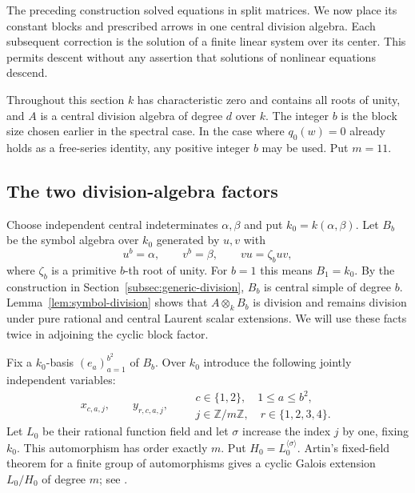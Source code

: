 \documentclass[11pt]{article}
\theoremstyle{definition}
\theoremstyle{remark}
\numberwithin{equation}{section}
\begin{document}
The preceding construction solved equations in split matrices.  We now
place its constant blocks and prescribed arrows in one central division
algebra.  Each subsequent correction is the solution of a finite linear
system over its center.  This permits descent without any assertion that
solutions of nonlinear equations descend.

Throughout this section $k$ has characteristic zero and contains all roots
of unity, and $A$ is a central division algebra of degree $d$ over $k$.
The integer $b$ is the block size chosen earlier in the spectral case.
In the case where $q_0(w)=0$ already holds as a free-series identity, any
positive integer $b$ may be used.  Put $m=11$.

\subsection{The two division-algebra factors}

Choose independent central indeterminates $\alpha,\beta$ and put
$k_0=k(\alpha,\beta)$.  Let $B_b$ be the symbol algebra over $k_0$
generated by $u,v$ with
\[
 u^b=\alpha,\qquad v^b=\beta,\qquad vu=\zeta_buv,
\]
where $\zeta_b$ is a primitive $b$-th root of unity.  For $b=1$ this
means $B_1=k_0$.  By the construction in Section~\ref{subsec:generic-division}, $B_b$
is central simple of degree $b$.  Lemma~\ref{lem:symbol-division}
shows that $A\otimes_k B_b$ is division and remains division under
pure rational and central Laurent scalar extensions.  We will use
these facts twice in adjoining the cyclic block factor.

Fix a $k_0$-basis $(e_a)_{a=1}^{b^2}$ of $B_b$.  Over $k_0$ introduce
the following jointly independent variables:
\[
 x_{c,a,j},\qquad y_{r,c,a,j},
 \qquad
 \begin{matrix}
 c\in\{1,2\},\quad 1\le a\le b^2,\\
 j\in\mathbb Z/m\mathbb Z,\quad r\in\{1,2,3,4\}.
 \end{matrix}
\]
Let $L_0$ be their rational function field and let $\sigma$ increase
the index $j$ by one, fixing $k_0$.  This automorphism has order exactly
$m$.  Put $H_0=L_0^{\langle\sigma\rangle}$.  Artin's fixed-field theorem
for a finite group of automorphisms gives a cyclic Galois extension
$L_0/H_0$ of degree $m$; see \cite[Corollary~3.11, p.~38]{MilneFT2022}.
\end{document}
